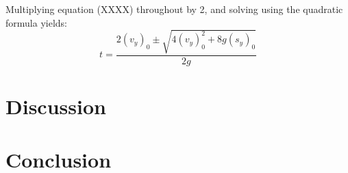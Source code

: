 \documentclass[a4paper]{article}
\begin{document}
Multiplying equation (XXXX) throughout by 2, and solving using the quadratic formula yields:
\begin{equation}
t = \frac{2(v_y)_0 \pm \sqrt{4(v_y)_0^2 + 8g(s_y)_0}}{2g}
\end{equation} 

\section{Discussion}


\section{Conclusion}



\end{document}
